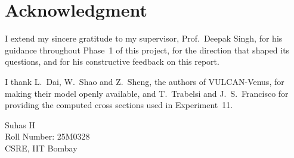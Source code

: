 \chapter*{Acknowledgment}
{}

I extend my sincere gratitude to my supervisor, Prof.\ Deepak Singh, for his guidance
throughout Phase~1 of this project, for the direction that shaped its questions, and for
his constructive feedback on this report.

I thank L.\ Dai, W.\ Shao and Z.\ Sheng, the authors of VULCAN-Venus, for making
their model openly available, and T.\ Trabelsi and J.\ S.\ Francisco for providing the computed cross sections used in Experiment~11.

\vspace{1cm}
\begin{flushright}
Suhas H\\
Roll Number: 25M0328\\
CSRE, IIT Bombay
\end{flushright}

